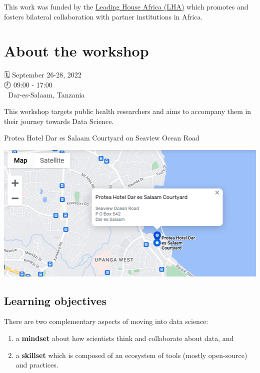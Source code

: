 \documentclass[
  letterpaper,
  DIV=11,
  numbers=noendperiod]{scrreprt}
\providecommand{\tightlist}{%
  \setlength{\itemsep}{0pt}\setlength{\parskip}{0pt}}\usepackage{longtable,booktabs,array}
\begin{document}
This work was funded by the
\href{https://www.swisstph.ch/en/research/leading-house-africa/}{Leading
House Africa (LHA)} which promotes and fosters bilateral collaboration
with partner institutions in Africa.


\hypertarget{about-the-workshop}{%
\chapter{About the workshop}\label{about-the-workshop}}

{🗓️} September 26-28, 2022\\
{🕘} 09:00 - 17:00\\
{🌇} Dar-es-Salaam, Tanzania

This workshop targets public health researchers and aims to accompany
them in their journey towards Data Science.

Protea Hotel Dar es Salaam Courtyard on Seaview Ocean Road

\includegraphics{./images/paste-67B4C38F.png}

\hypertarget{learning-objectives}{%
\section{Learning objectives}\label{learning-objectives}}

There are two complementary aspects of moving into data science:

\begin{enumerate}
\def\labelenumi{\arabic{enumi}.}
\tightlist
\item
  a \textbf{mindset} about how scientists think and collaborate about
  data, and
\item
  a \textbf{skillset} which is composed of an ecosystem of tools (mostly
  open-source) and practices.
\end{enumerate}
\end{document}
